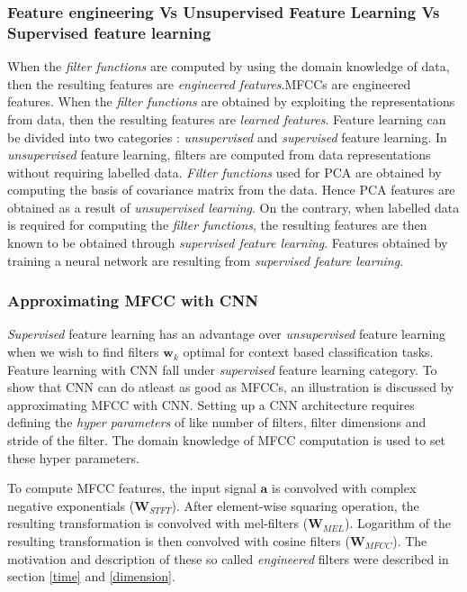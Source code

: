 \subsubsection{Feature engineering Vs Unsupervised Feature Learning Vs Supervised feature learning}
\label{feature}
When the \textit{filter functions} are computed by using the domain knowledge of data, then the resulting features are \textit{engineered features}.MFCCs are engineered features. When the \textit{filter functions} are obtained by exploiting the representations from data, then the resulting features are \textit{learned features}. Feature learning can be divided into two categories : \textit{unsupervised} and \textit{supervised} feature learning. In \textit{unsupervised} feature learning, filters are computed from data representations without requiring labelled data. \textit{Filter functions} used for PCA are obtained by computing the basis of covariance matrix from the data. Hence PCA features are obtained as a result of \textit{unsupervised learning}. On the contrary, when labelled data is required for computing the \textit{filter functions}, the resulting features are then known to be obtained through \textit{supervised feature learning}. Features obtained by training a neural network are resulting from \textit{supervised feature learning}.   
\bigskip

\subsubsection{Approximating MFCC with CNN}
\textit{Supervised} feature learning has an advantage over \textit{unsupervised} feature learning when we wish to find filters $\textbf{w}_{k}$ optimal for context based classification tasks. Feature learning with CNN fall under \textit{supervised} feature learning category.
To show that CNN can do atleast as good as MFCCs, an illustration is discussed by approximating MFCC with CNN. Setting up a CNN architecture requires defining the \textit{hyper parameters} of like number of filters, filter dimensions and stride of the filter. The domain knowledge of MFCC computation is used to set these hyper parameters.
\bigskip  

\noindent To compute MFCC features, the input signal $\textbf{a}$ is convolved with complex negative exponentials ($\textbf{W}_{STFT}$). After element-wise squaring operation, the resulting transformation is convolved with mel-filters ($\textbf{W}_{MEL}$). Logarithm of the resulting transformation is then convolved with cosine filters ($\textbf{W}_{MFCC}$). The motivation and description of these so called \textit{engineered} filters were described in section \ref{time} and \ref{dimension}. 

